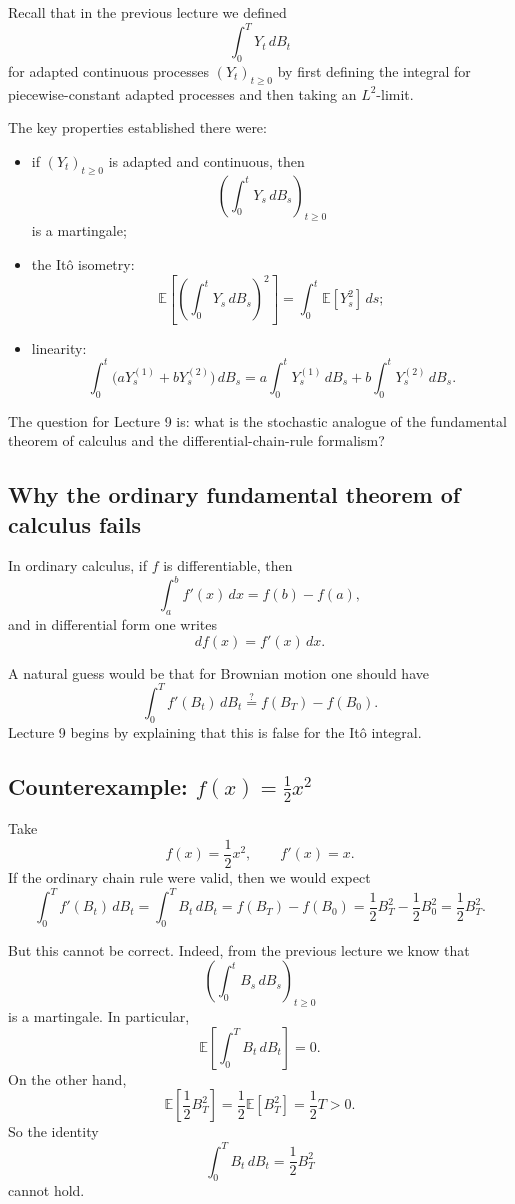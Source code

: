 \documentclass[11pt]{article}
\theoremstyle{definition}
\begin{document}
Recall that in the previous lecture we defined
\[
\int_0^T Y_t\,dB_t
\]
for adapted continuous processes \((Y_t)_{t\ge 0}\) by first defining the integral for piecewise-constant adapted processes and then taking an \(L^2\)-limit.

The key properties established there were:

\begin{itemize}[leftmargin=2em]
    \item if \((Y_t)_{t\ge 0}\) is adapted and continuous, then
    \[
    \left(\int_0^t Y_s\,dB_s\right)_{t\ge 0}
    \]
    is a martingale;
    \item the It\^o isometry:
    \[
    \mathbb E\!\left[\left(\int_0^t Y_s\,dB_s\right)^2\right]
    =
    \int_0^t \mathbb E[Y_s^2]\,ds;
    \]
    \item linearity:
    \[
    \int_0^t \bigl(aY_s^{(1)}+bY_s^{(2)}\bigr)\,dB_s
    =
    a\int_0^t Y_s^{(1)}\,dB_s
    +
    b\int_0^t Y_s^{(2)}\,dB_s.
    \]
\end{itemize}

The question for Lecture 9 is: what is the stochastic analogue of the fundamental theorem of calculus and the differential-chain-rule formalism?

\subsection{Why the ordinary fundamental theorem of calculus fails}

In ordinary calculus, if \(f\) is differentiable, then
\[
\int_a^b f'(x)\,dx=f(b)-f(a),
\]
and in differential form one writes
\[
df(x)=f'(x)\,dx.
\]

A natural guess would be that for Brownian motion one should have
\[
\int_0^T f'(B_t)\,dB_t
\overset{?}{=}
f(B_T)-f(B_0).
\]
Lecture 9 begins by explaining that this is false for the It\^o integral.

\subsection[Counterexample: f(x) = x squared over 2]{Counterexample: \texorpdfstring{$f(x)=\tfrac12 x^2$}{f(x) = x squared over 2}}

Take
\[
f(x)=\frac12 x^2,
\qquad
f'(x)=x.
\]
If the ordinary chain rule were valid, then we would expect
\[
\int_0^T f'(B_t)\,dB_t
=
\int_0^T B_t\,dB_t
=
f(B_T)-f(B_0)
=
\frac12 B_T^2-\frac12 B_0^2
=
\frac12 B_T^2.
\]

But this cannot be correct. Indeed, from the previous lecture we know that
\[
\left(\int_0^t B_s\,dB_s\right)_{t\ge 0}
\]
is a martingale. In particular,
\[
\mathbb E\!\left[\int_0^T B_t\,dB_t\right]=0.
\]
On the other hand,
\[
\mathbb E\!\left[\frac12 B_T^2\right]
=
\frac12 \mathbb E[B_T^2]
=
\frac12 T
>
0.
\]
So the identity
\[
\int_0^T B_t\,dB_t=\frac12 B_T^2
\]
cannot hold.
\end{document}
